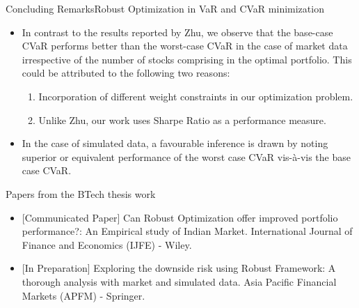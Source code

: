 \documentclass{beamer}
\begin{document}
\begin{frame}{Concluding Remarks}{Robust Optimization in VaR and CVaR minimization}
\begin{itemize}
    \item{In contrast to the results reported by Zhu, we observe that the base-case CVaR performs better than the worst-case CVaR in the case of market data irrespective of the number of stocks comprising in the optimal portfolio. This could be attributed to the following two reasons:
    \begin{enumerate}
        \item Incorporation of different weight constraints in our optimization problem.
        \item Unlike Zhu, our work uses Sharpe Ratio as a performance measure.
    \end{enumerate}}
    \item{In the case of simulated data, a favourable inference is drawn by noting superior or equivalent performance of the worst case CVaR vis-\`a-vis the base case CVaR.}
\end{itemize}
\end{frame}


\begin{frame}{Papers from the BTech thesis work}
    \begin{itemize}
        \item{ [Communicated Paper] Can Robust Optimization offer improved portfolio performance?: An Empirical study of Indian Market. International Journal of Finance and Economics (IJFE) - Wiley.}
        \item{ [In Preparation] Exploring the downside risk using Robust Framework: A thorough analysis with market and simulated data. Asia Pacific Financial Markets (APFM) - Springer.}
        
    \end{itemize}
\end{frame}








\end{document}
